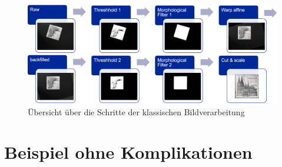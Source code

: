 \documentclass[12pt,toc=bib,toc=listof]{scrreprt}
\begin{document}
\begin{figure}[h]
\includegraphics[width=\textwidth]{./../bilder/bv_overview.png}
\caption{Übersicht über die Schritte der klassischen Bildverarbeitung}
\label{fig:bv_overview}
\end{figure}



\section{Beispiel ohne Komplikationen}
\label{sec_bv:paradebsp}
\end{document}
